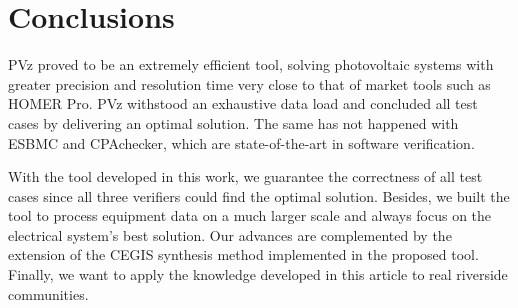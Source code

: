\documentclass[10pt,journal,compsoc]{IEEEtran}
\begin{document}
\section{Conclusions} 
PVz proved to be an extremely efficient tool, solving photovoltaic systems with greater precision and resolution time very close to that of market tools such as HOMER Pro. PVz withstood an exhaustive data load and concluded all test cases by delivering an optimal solution. The same has not happened with ESBMC and CPAchecker, which are state-of-the-art in software verification.

With the tool developed in this work, we guarantee the correctness of all test cases since all three verifiers could find the optimal solution. Besides, we built the tool to process equipment data on a much larger scale and always focus on the electrical system's best solution. Our advances are complemented by the extension of the CEGIS synthesis method implemented in the proposed tool. Finally, we want to apply the knowledge developed in this article to real riverside communities.

%
\end{document}
